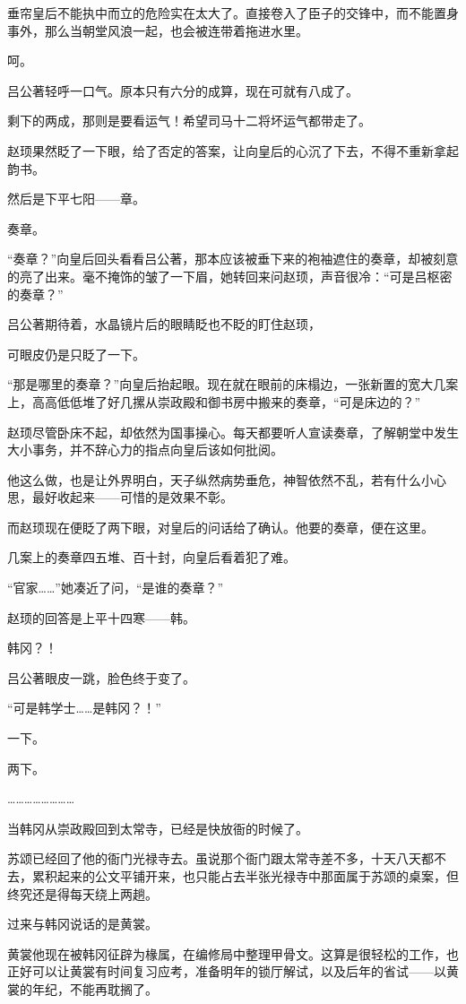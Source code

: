 垂帘皇后不能执中而立的危险实在太大了。直接卷入了臣子的交锋中，而不能置身事外，那么当朝堂风浪一起，也会被连带着拖进水里。

呵。

吕公著轻呼一口气。原本只有六分的成算，现在可就有八成了。

剩下的两成，那则是要看运气！希望司马十二将坏运气都带走了。

赵顼果然眨了一下眼，给了否定的答案，让向皇后的心沉了下去，不得不重新拿起韵书。

然后是下平七阳——章。

奏章。

“奏章？”向皇后回头看看吕公著，那本应该被垂下来的袍袖遮住的奏章，却被刻意的亮了出来。毫不掩饰的皱了一下眉，她转回来问赵顼，声音很冷：“可是吕枢密的奏章？”

吕公著期待着，水晶镜片后的眼睛眨也不眨的盯住赵顼，

可眼皮仍是只眨了一下。

“那是哪里的奏章？”向皇后抬起眼。现在就在眼前的床榻边，一张新置的宽大几案上，高高低低堆了好几摞从崇政殿和御书房中搬来的奏章，“可是床边的？”

赵顼尽管卧床不起，却依然为国事操心。每天都要听人宣读奏章，了解朝堂中发生大小事务，并不辞心力的指点向皇后该如何批阅。

他这么做，也是让外界明白，天子纵然病势垂危，神智依然不乱，若有什么小心思，最好收起来——可惜的是效果不彰。


而赵顼现在便眨了两下眼，对皇后的问话给了确认。他要的奏章，便在这里。

几案上的奏章四五堆、百十封，向皇后看着犯了难。

“官家……”她凑近了问，“是谁的奏章？”

赵顼的回答是上平十四寒——韩。

韩冈？！

吕公著眼皮一跳，脸色终于变了。

“可是韩学士……是韩冈？！”

一下。

两下。

……………………

当韩冈从崇政殿回到太常寺，已经是快放衙的时候了。

苏颂已经回了他的衙门光禄寺去。虽说那个衙门跟太常寺差不多，十天八天都不去，累积起来的公文平铺开来，也只能占去半张光禄寺中那面属于苏颂的桌案，但终究还是得每天绕上两趟。

过来与韩冈说话的是黄裳。

黄裳他现在被韩冈征辟为椽属，在编修局中整理甲骨文。这算是很轻松的工作，也正好可以让黄裳有时间复习应考，准备明年的锁厅解试，以及后年的省试——以黄裳的年纪，不能再耽搁了。

